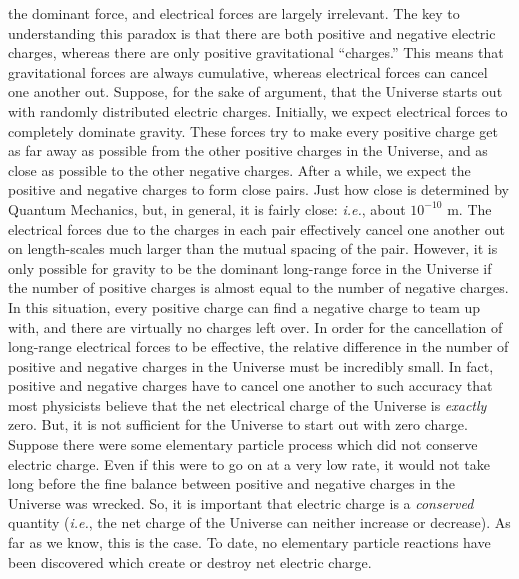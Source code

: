 the dominant force, and electrical forces are largely irrelevant.
The key to understanding this paradox is that there are both
positive and negative electric charges, whereas there are only positive
gravitational ``charges.'' This means that gravitational forces are always
cumulative,
whereas electrical forces can cancel one another out. Suppose, for the
sake of argument,  that the Universe
starts out with randomly distributed 
 electric charges. Initially, we expect
electrical forces to completely dominate gravity. These forces try to make
 every positive
charge get as far away as possible from the  other positive charges in the Universe, and as close
as possible to the other negative charges. After a while, we  expect 
the positive and
negative charges to form close pairs. Just how close is determined by Quantum
Mechanics, but, in general, it is fairly close: {\em i.e.}, about $10^{-10}$ m.
The electrical forces due to the charges in each pair
effectively  cancel
one another out  on length-scales much larger than the mutual spacing
of the pair. 
However, it is only possible for
gravity to be the dominant long-range force in the Universe if the number
of positive charges is almost equal to the number of
negative charges. In this
situation, every positive charge can find a negative charge to team up with, and
there are virtually no charges left over. In order for the cancellation
of long-range electrical forces to be effective, the relative difference in the
number of positive and negative charges in the Universe must be  incredibly
small. In fact, positive and negative charges have to cancel one another
 to such accuracy that most physicists believe that the net electrical
charge of the Universe is
{\em exactly} zero. But, it is not sufficient for the Universe to start out with zero
charge. Suppose there were some elementary particle process which did not
conserve electric charge. Even if this were to go on at a very low
rate, it would not take long before the fine balance between
positive and negative charges in the Universe was wrecked. So, 
it is important that electric
charge is a {\em conserved}\/ quantity ({\em i.e.}, the net charge of the Universe can neither
increase or decrease). As far as we know, this is the case. To date, no 
elementary particle reactions have been discovered which create or destroy net
electric charge.

